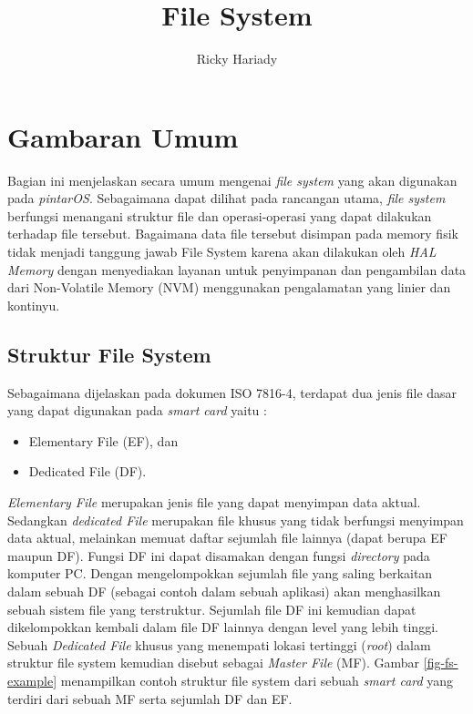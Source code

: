 \documentclass[a4paper, 12pt]{report}
\begin{document}
\title{File System}
\author{Ricky Hariady}

\maketitle

\chapter{Gambaran Umum}
\label{overview}

Bagian ini menjelaskan secara umum mengenai \emph{file system} yang akan digunakan pada \emph{pintarOS}. Sebagaimana dapat dilihat pada rancangan utama, \emph{file system} berfungsi menangani struktur file dan operasi-operasi yang dapat dilakukan terhadap file tersebut. Bagaimana data file tersebut disimpan pada memory fisik tidak menjadi tanggung jawab File System karena akan dilakukan oleh \emph{HAL Memory} dengan  menyediakan layanan untuk penyimpanan dan pengambilan data dari Non-Volatile Memory (NVM) menggunakan pengalamatan yang linier dan kontinyu.

\section{Struktur File System}
\label{file-system-structure}

Sebagaimana dijelaskan pada dokumen ISO 7816-4, terdapat dua jenis file dasar yang dapat digunakan pada \textsl{smart card} yaitu :
\begin{itemize}
\item Elementary File (EF), dan
\item Dedicated File (DF).
\end{itemize}

\emph{Elementary File} merupakan jenis file yang dapat menyimpan data aktual. Sedangkan \emph{dedicated File} merupakan file khusus yang tidak berfungsi menyimpan data aktual, melainkan memuat daftar sejumlah file lainnya (dapat berupa EF maupun DF). Fungsi DF ini dapat disamakan dengan fungsi \emph{directory} pada komputer PC. Dengan mengelompokkan sejumlah file yang saling berkaitan dalam sebuah DF (sebagai contoh dalam sebuah aplikasi) akan menghasilkan sebuah sistem file yang terstruktur. Sejumlah file DF ini kemudian dapat dikelompokkan kembali dalam file DF lainnya dengan level yang lebih tinggi. Sebuah \emph{Dedicated File} khusus yang menempati lokasi tertinggi (\emph{root}) dalam struktur file system kemudian disebut sebagai \emph{Master File} (MF). Gambar \ref{fig-fs-example} menampilkan contoh struktur file system dari sebuah \textsl{smart card} yang terdiri dari sebuah MF serta sejumlah DF dan EF.
\end{document}
